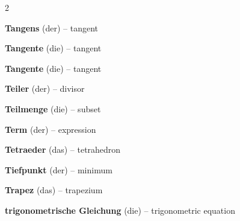 \begin{multicols}{2}
\par\nopagebreak
\textbf{Tangens} (der) -- tangent\dotfill\hyperref[e:134]{\pageref*{e:134}}\par
\textbf{Tangente} (die) -- tangent\dotfill\hyperref[e:224]{\pageref*{e:224}}\par
\textbf{Tangente} (die) -- tangent\dotfill\hyperref[e:279]{\pageref*{e:279}}\par
\textbf{Teiler} (der) -- divisor\dotfill\hyperref[e:54]{\pageref*{e:54}}\par
\textbf{Teilmenge} (die) -- subset\dotfill\hyperref[e:98]{\pageref*{e:98}}\par
\textbf{Term} (der) -- expression\dotfill\hyperref[e:72]{\pageref*{e:72}}\par
\textbf{Tetraeder} (das) -- tetrahedron\dotfill\hyperref[e:234]{\pageref*{e:234}}\par
\textbf{Tiefpunkt} (der) -- minimum\dotfill\hyperref[e:283]{\pageref*{e:283}}\par
\textbf{Trapez} (das) -- trapezium\dotfill\hyperref[e:202]{\pageref*{e:202}}\par
\textbf{trigonometrische Gleichung} (die) -- trigonometric equation\dotfill\hyperref[e:86]{\pageref*{e:86}}\par


\end{multicols}
